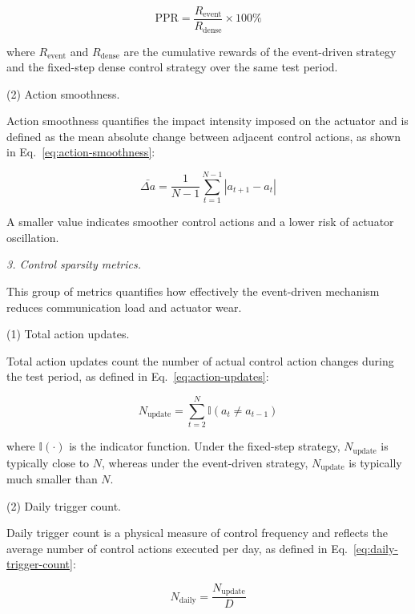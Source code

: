 ﻿\documentclass[preprint,12pt,number]{elsarticle}
\begin{document}
\[
\mathrm{PPR} = \frac{R_{\text{event}}}{R_{\text{dense}}} \times 100\% \tag{28}\label{eq:ppr}
\]

\noindent where \(R_{\text{event}}\) and \(R_{\text{dense}}\) are the cumulative rewards of the event-driven strategy and the fixed-step dense control strategy over the same test period.

\par\smallskip
\noindent (2) Action smoothness.
\par\nobreak\noindent Action smoothness quantifies the impact intensity imposed on the actuator and is defined as the mean absolute change between adjacent control actions, as shown in Eq.~\eqref{eq:action-smoothness}:

\[
\bar{\Delta a} = \frac{1}{N-1} \sum_{t=1}^{N-1} |a_{t+1} - a_t| \tag{29}\label{eq:action-smoothness}
\]

A smaller value indicates smoother control actions and a lower risk of actuator oscillation.

\par\medskip
\noindent\textit{3. Control sparsity metrics.}\label{control-sparsity-metrics}
\par\smallskip

This group of metrics quantifies how effectively the event-driven mechanism reduces communication load and actuator wear.

\par\smallskip
\noindent (1) Total action updates.
\par\nobreak\noindent Total action updates count the number of actual control action changes during the test period, as defined in Eq.~\eqref{eq:action-updates}:

\[
N_{\text{update}} = \sum_{t=2}^{N} \mathbb{I}(a_t \neq a_{t-1}) \tag{30}\label{eq:action-updates}
\]

\noindent where \(\mathbb{I}(\cdot)\) is the indicator function. Under the fixed-step strategy, \(N_{\text{update}}\) is typically close to \(N\), whereas under the event-driven strategy, \(N_{\text{update}}\) is typically much smaller than \(N\).

\par\smallskip
\noindent (2) Daily trigger count.
\par\nobreak\noindent Daily trigger count is a physical measure of control frequency and reflects the average number of control actions executed per day, as defined in Eq.~\eqref{eq:daily-trigger-count}:

\[
N_{\text{daily}} = \frac{N_{\text{update}}}{D} \tag{31}\label{eq:daily-trigger-count}
\]
\end{document}
